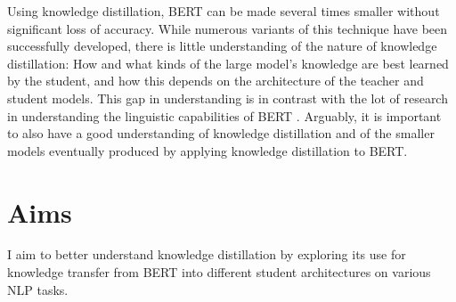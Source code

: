 \documentclass[bsc,frontabs,singlespacing,parskip,deptreport]{infthesis}
\begin{document}
{{    %
    
    Using knowledge distillation, BERT can be made several times smaller without significant loss of accuracy.
    While numerous variants of this technique have been successfully developed, there is little understanding of the nature of knowledge distillation: 
    How and what kinds of the large model's knowledge are best learned by the student, and how this depends on the architecture of the teacher and student models.
    This gap in understanding is in contrast with the lot of research in understanding the linguistic capabilities of BERT \citep{Ganesh_2019,Tenney_2019b,Kovaleva_2019,Lin_2019}.
    Arguably, it is important to also have a good understanding of knowledge distillation and of the smaller models eventually produced by applying knowledge distillation to BERT.
        
  }
  
  \section{Aims}{
    I aim to better understand knowledge distillation by exploring its use for knowledge transfer from BERT into different student architectures on various NLP tasks.

}}
\end{document}
